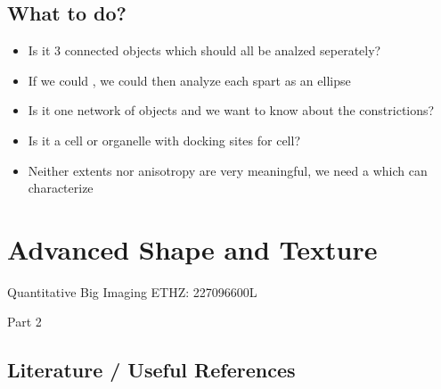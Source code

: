 \documentclass[letterpaper,10pt,english]{sphinxmanual}
\begin{document}
\section{What to do?}
\label{\detokenize{06-ShapeAnalysis:what-to-do}}\begin{itemize}
\item {} 
\sphinxAtStartPar
Is it 3 connected objects which should all be analzed seperately?

\item {} 
\sphinxAtStartPar
If we could , we could then analyze each spart as an ellipse

\item {} 
\sphinxAtStartPar
Is it one network of objects and we want to know about the constrictions?

\item {} 
\sphinxAtStartPar
Is it a cell or organelle with docking sites for cell?

\item {} 
\sphinxAtStartPar
Neither extents nor anisotropy are very meaningful, we need a  which can characterize

\end{itemize}


\chapter{Advanced Shape and Texture}
\label{\detokenize{06-AdvancedShapeAndTexture:advanced-shape-and-texture}}\label{\detokenize{06-AdvancedShapeAndTexture::doc}}




\sphinxAtStartPar
Quantitative Big Imaging ETHZ: 227\sphinxhyphen{}0966\sphinxhyphen{}00L


\sphinxAtStartPar
Part 2






\section{Literature / Useful References}
\label{\detokenize{06-AdvancedShapeAndTexture:literature-useful-references}}
\end{document}
